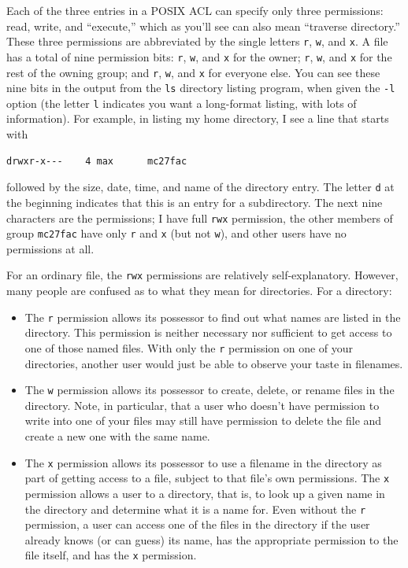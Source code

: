 Each of the three entries in a POSIX ACL can specify only three
permissions: read, write, and ``execute,'' which as you'll see can also
mean ``traverse directory.''  These three permissions are abbreviated
by the single letters \texttt{r}, \texttt{w}, and \texttt{x}.  A file has a total of nine
permission bits: \texttt{r}, \texttt{w}, and \texttt{x} for the owner; \texttt{r}, \texttt{w}, and \texttt{x} for the rest
of the owning group; and \texttt{r}, \texttt{w}, and \texttt{x} for everyone else. You can see
these nine bits in the output from the \verb|ls| directory listing
program, when given the \verb|-l| option (the letter \verb|l|
indicates you want a long-format listing, with lots of information).
For example, in listing my home directory, I see a line that starts with
\begin{verbatim}
drwxr-x---    4 max      mc27fac
\end{verbatim}
followed by the size, date, time, and name of the directory entry.
The letter \texttt{d} at the beginning indicates that this is an entry for a
subdirectory.  The next nine characters are the permissions; I have
full \texttt{rwx} permission, the other members of group \texttt{mc27fac} have only \texttt{r} and
\texttt{x} (but not \texttt{w}), and other users have no permissions at all.

For an ordinary file, the \texttt{rwx} permissions are relatively
self-explanatory.  However, many people are confused as to what they mean
for directories.  For a directory:
\begin{itemize}
\item
The \texttt{r} permission allows its possessor to find out what names are
listed in the directory.  This permission is neither necessary nor
sufficient to get access to one of those named files.  With only the \texttt{r}
permission on one of your directories, another user would just be able
to observe your taste in filenames.
\item
The \texttt{w} permission allows its possessor to create, delete, or rename
files in the directory.  Note, in particular, that a user who doesn't
have permission to write into one of your files may still have
permission to delete the file and create a new one with the same name.
\item
The \texttt{x} permission allows its possessor to use a filename in the
directory as part of getting access to a file, subject to that file's
own permissions.  The \texttt{x} permission allows a user to
 a directory, that is, to look up a given name in the
directory and determine what it is a name for.
Even without the \texttt{r}
permission, a user can access one of the files in
the directory if the user already knows (or can guess) its name, has the
appropriate permission to the file itself, and has the \texttt{x} permission.
\end{itemize}

